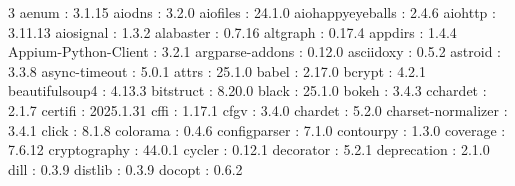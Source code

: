 \begin{multicols}{3}
aenum : 3.1.15\newline
aiodns : 3.2.0\newline
aiofiles : 24.1.0\newline
aiohappyeyeballs : 2.4.6\newline
aiohttp : 3.11.13\newline
aiosignal : 1.3.2\newline
alabaster : 0.7.16\newline
altgraph : 0.17.4\newline
appdirs : 1.4.4\newline
Appium-Python-Client : 3.2.1\newline
argparse-addons : 0.12.0\newline
asciidoxy : 0.5.2\newline
astroid : 3.3.8\newline
async-timeout : 5.0.1\newline
attrs : 25.1.0\newline
babel : 2.17.0\newline
bcrypt : 4.2.1\newline
beautifulsoup4 : 4.13.3\newline
bitstruct : 8.20.0\newline
black : 25.1.0\newline
bokeh : 3.4.3\newline
cchardet : 2.1.7\newline
certifi : 2025.1.31\newline
cffi : 1.17.1\newline
cfgv : 3.4.0\newline
chardet : 5.2.0\newline
charset-normalizer : 3.4.1\newline
click : 8.1.8\newline
colorama : 0.4.6\newline
configparser : 7.1.0\newline
contourpy : 1.3.0\newline
coverage : 7.6.12\newline
cryptography : 44.0.1\newline
cycler : 0.12.1\newline
decorator : 5.2.1\newline
deprecation : 2.1.0\newline
dill : 0.3.9\newline
distlib : 0.3.9\newline
docopt : 0.6.2\newline

\end{multicols}
